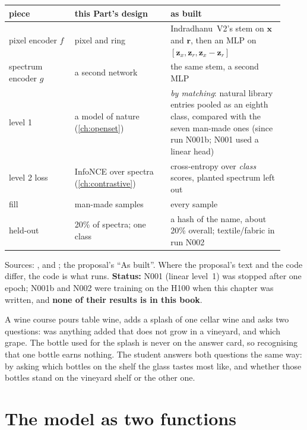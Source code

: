 \documentclass[11pt,a4paper,oneside,openany]{book}
\newcommand{\B}[1]{{\symbf{#1}}}
\newcommand{\B}[1]{{\bm{#1}}}
\newcommand{\vx}{\B{x}}
\newcommand{\vr}{\B{r}}
\newcommand{\vz}{\B{z}}
\begin{document}
\begin{center}\small
\begin{tabular}{@{}p{0.22\linewidth}p{0.32\linewidth}p{0.38\linewidth}@{}}
\toprule
piece & this Part's design & as built\\
\midrule
pixel encoder $f$ & pixel and ring & Indradhanu~V2's stem on $\vx$ and $\vr$, then an MLP on $[\vz_x,\vz_r,\vz_x-\vz_r]$\\
spectrum encoder $g$ & a second network & the same stem, a second MLP\\
level 1 & a model of nature (\cref{ch:openset}) & \emph{by matching}: natural library entries pooled as an eighth class, compared with the seven man-made ones
(since run N001b; N001 used a linear head)\\
level 2 loss & InfoNCE over spectra (\cref{ch:contrastive}) & cross-entropy over \emph{class} scores, planted spectrum left out\\
fill & man-made samples & every sample\\
held-out & 20\% of spectra; one class & a hash of the name, about 20\% overall; textile/fabric in run N002\\
\bottomrule
\end{tabular}
\end{center}
Sources: ,  and ; the proposal's ``As built''. Where the proposal's text and the code
differ, the code is what runs. \textbf{Status:} N001 (linear level~1) was stopped after one epoch; N001b and N002 were training on the H100 when this chapter was written,
and \textbf{none of their results is in this book}.

\begin{analogy}
A wine course pours table wine, adds a splash of one cellar wine and asks two questions: was anything added that does not grow in a vineyard, and which grape. The bottle used
for the splash is never on the answer card, so recognising that one bottle earns nothing. The student answers both questions the same way: by asking which bottles on the shelf
the glass tastes most like, and whether those bottles stand on the vineyard shelf or the other one.
\end{analogy}

\section{The model as two functions}
\end{document}
